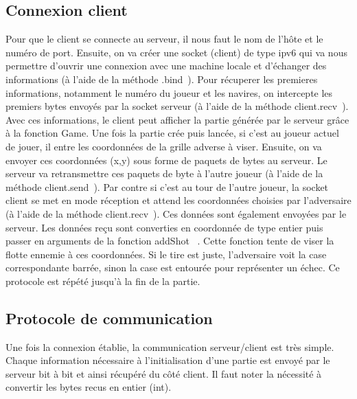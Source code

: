 \documentclass{article}
\begin{document}
	\subsection{Connexion client}
	Pour que le client se connecte au serveur, il nous faut le nom de l'h\^ote et le num\'ero de port.
	\newline Ensuite, on va cr\'eer une socket (client) de type ipv6 qui va nous permettre d'ouvrir une connexion avec une machine locale et d'\'echanger des informations (\`a l'aide de la m\'ethode  \guillemotleft .bind\guillemotright\ ).
	\newline Pour r\'ecuperer les premieres informations, notamment le num\'ero du joueur et les navires, on intercepte les premiers bytes envoy\'es par la socket serveur (\`a l'aide de la m\'ethode \guillemotleft client.recv\guillemotright\ ).
	\newline Avec ces informations, le client peut afficher la partie g\'en\'er\'ee par le serveur gr\^ace \`a la fonction Game.
	\newline Une fois la partie cr\'ee puis lanc\'ee, si c'est au joueur actuel de jouer, il entre les coordonn\'ees de la grille adverse \`a viser. Ensuite, on va envoyer ces coordonn\'ees (x,y) sous forme de paquets de bytes au serveur. Le serveur va retransmettre ces paquets de byte \`a l'autre joueur (\`a l'aide de la m\'ethode \guillemotleft client.send\guillemotright\ ).
	\newline Par contre si c'est au tour de l'autre joueur, la socket client se met en mode r\'eception et attend les coordonn\'ees choisies par l'adversaire (\`a l'aide de la m\'ethode \guillemotleft client.recv\guillemotright\ ). Ces donn\'ees sont \'egalement envoy\'ees par le serveur. 
	\newline Les donn\'ees re\c cu sont converties en coordonn\'ee de type entier puis passer en arguments de la fonction \guillemotleft addShot \guillemotright\ . Cette fonction tente de viser la flotte ennemie \`a ces coordonn\'ees. Si le tire est juste, l'adversaire voit la case correspondante barr\'ee, sinon la case est entour\'ee pour repr\'esenter un \'echec.    
	\newline Ce protocole est r\'ep\'et\'e jusqu'\`a la fin de la partie.

	\subsection{Protocole de communication}
	Une fois la connexion \'etablie, la communication serveur/client est tr\`es simple.
	Chaque information n\'ecessaire \`a l'initialisation d'une partie est envoy\'e par le serveur bit \`a bit et ainsi r\'ecup\'er\'e du c\^ot\'e client.
	Il faut noter la n\'ecessit\'e \`a convertir les bytes recus en entier (int).
\newpage
\end{document}
